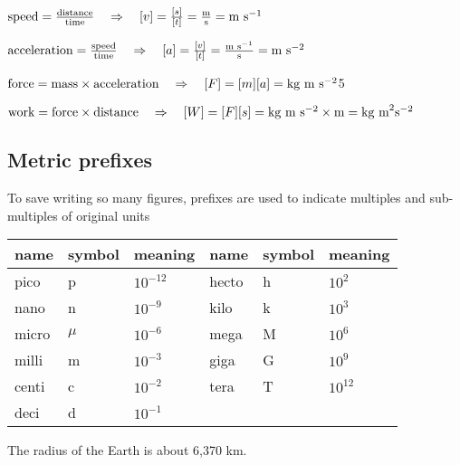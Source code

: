 \newpage

\begin{soln}
 $\text{speed} = \frac{\text{distance}}{\text{time}} \quad \Rightarrow \quad [v] = \frac{[s]}{[t]} = \frac{\text{m}}{\text{s}} = \text{m s}^{-1}$
	\end{soln}
 \begin{soln}
	$\text{acceleration} = \frac{\text{speed}}{\text{time}} \quad \Rightarrow \quad [a] = \frac{[v]}{[t]} = \frac{\text{m s}^{-1}}{\text{s}} = \text{m s}^{-2}$ 
\end{soln}
 \begin{soln}
	$\text{force} = \text{mass} \times \text{acceleration} \quad \Rightarrow \quad [F] = [m][a] = \text{kg}\text{ m s$^{-2}$} $5
	\end{soln}
 \begin{soln}
	$\text{work} = \text{force} \times \text{distance} \quad \Rightarrow \quad [W] = [F][s] = \text{kg}\text{ m s$^{-2}$} \times \text{m} = \text{kg m}^2 \text{s}^{-2}$ 
\end{soln}


\subsection{Metric prefixes}

To save writing so many figures, prefixes are used to indicate multiples and sub-multiples of original units

\begin{center}
	\begin{tabular}{|C{1.5cm}|C{1.5cm}|C{1.5cm}||C{1.5cm}|C{1.5cm}|C{1.5cm}|}
		\hline name & symbol & meaning & name & symbol & meaning \\ 
		\hline pico & p & $10^{-12}$ & hecto & h & $10^{2}$\\ 
		\hline nano & n & $10^{-9}$ & kilo & k & $10^{3}$\\ 
		\hline micro & $\mu$ & $10^{-6}$ & mega & M & $10^{6}$\\ 
		\hline milli & m & $10^{-3}$ & giga & G & $10^{9}$\\ 
		\hline centi & c & $10^{-2}$ & tera & T & $10^{12}$\\ 
		\hline deci & d & $10^{-1}$ & & &\\ 
		\hline 
	\end{tabular} 
\end{center}

	The radius of the Earth is about 6,370 km.
	
